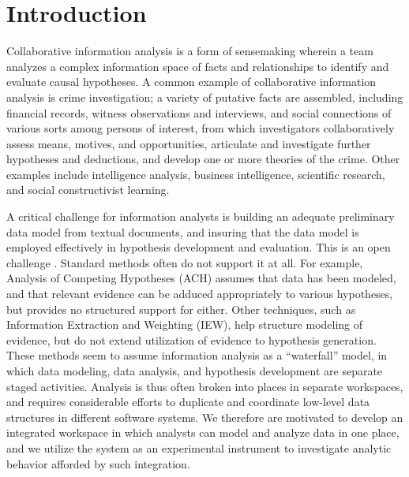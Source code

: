 \section{Introduction}\label{introduction}

Collaborative information analysis is a form of sensemaking wherein a
team analyzes a complex information space of facts and relationships to
identify and evaluate causal hypotheses. A common example of
collaborative information analysis is crime investigation; a variety of
putative facts are assembled, including financial records, witness
observations and interviews, and social connections of various sorts
among persons of interest, from which investigators collaboratively
assess means, motives, and opportunities, articulate and investigate
further hypotheses and deductions, and develop one or more theories of
the crime. Other examples include intelligence analysis, business
intelligence, scientific research, and social constructivist learning.

A critical challenge for information analysts is building an adequate
preliminary data model from textual documents, and insuring that the
data model is employed effectively in hypothesis development and
evaluation. This is an open challenge \autocite{Badalamente2005}.
Standard methods often do not support it at all. For example, Analysis
of Competing Hypotheses (ACH) assumes that data has been modeled, and
that relevant evidence can be adduced appropriately to various
hypotheses, but provides no structured support for either. Other
techniques, such as Information Extraction and Weighting (IEW), help
structure modeling of evidence, but do not extend utilization of
evidence to hypothesis generation. These methods seem to assume
information analysis as a ``waterfall'' model, in which data modeling,
data analysis, and hypothesis development are separate staged
activities. Analysis is thus often broken into places in separate
workspaces, and requires considerable efforts to duplicate and
coordinate low-level data structures in different software systems. We
therefore are motivated to develop an integrated workspace in which
analysts can model and analyze data in one place, and we utilize the
system as an experimental instrument to investigate analytic behavior
afforded by such integration.

